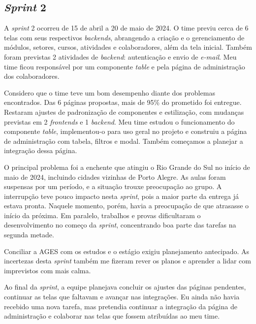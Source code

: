 \subsection{\textit{Sprint} 2}

A \textit{sprint} 2 ocorreu de 15 de abril a 20 de maio de 2024. O time previu cerca de 6 telas com seus respectivos
\textit{backends}, abrangendo a criação e o gerenciamento de módulos, setores,
cursos, atividades e colaboradores, além da tela inicial. Também foram previstas
2 atividades de \textit{backend}: autenticação e envio de \textit{e-mail}. Meu
time ficou responsável por um componente \textit{table} e pela página de
administração dos colaboradores.

Considero que o time teve um bom desempenho diante dos problemas encontrados.
Das 6 páginas propostas, mais de 95\% do prometido foi entregue. Restaram ajustes
de padronização de componentes e estilização, com mudanças previstas em 2
\textit{frontends} e 1 \textit{backend}. Meu time estudou o funcionamento do
componente \textit{table}, implementou-o para uso geral no projeto e construiu a
página de administração com tabela, filtros e modal. Também começamos a planejar
a integração dessa página.

O principal problema foi a enchente que atingiu o Rio Grande do Sul no início
de maio de 2024, incluindo cidades vizinhas de Porto Alegre. As aulas foram
suspensas por um período, e a situação trouxe preocupação ao grupo. A
interrupção teve pouco impacto nesta \textit{sprint}, pois a maior parte da
entrega já estava pronta. Naquele momento, porém, havia a preocupação de que
atrasasse o início da próxima. Em paralelo,
trabalhos e provas dificultaram o desenvolvimento no começo da \textit{sprint},
concentrando boa parte das tarefas na segunda metade.

Conciliar a AGES com os estudos e o estágio exigiu planejamento antecipado.
As incertezas desta \textit{sprint} também me fizeram rever os planos e aprender
a lidar com imprevistos com mais calma.

Ao final da \textit{sprint}, a equipe planejava concluir os ajustes das páginas
pendentes, continuar as telas que faltavam e avançar nas integrações. Eu ainda
não havia recebido uma nova tarefa, mas pretendia continuar a integração da
página de administração e colaborar nas telas que fossem atribuídas ao meu time.

